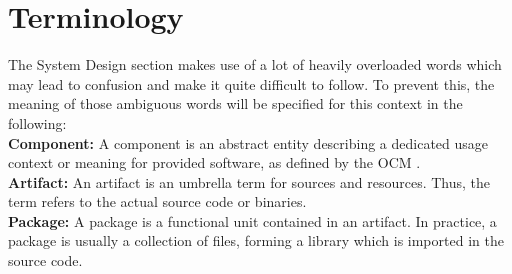





\section{Terminology}
The System Design section makes use of a lot of heavily overloaded words which may lead to confusion and make it quite difficult to follow. To prevent this, the meaning of those ambiguous words will be specified for this context in the following:\\

\noindent
\textbf{Component:} A component is an abstract entity describing a dedicated usage context or meaning for provided software, as defined by the OCM \cite{OCMSpec}.\\
\textbf{Artifact:} An artifact is an umbrella term for sources and resources. Thus, the term refers to the actual source code or binaries.\\
\textbf{Package:} A package is a functional unit contained in an artifact. In practice, a package is usually a collection of files, forming a library which is imported in the source code. 

